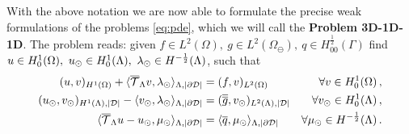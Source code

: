 \documentclass[r]{siamart171218}
\newcommand{\kentold}[1]{{\color{black}#1}}
\newcommand{\paoloold}[1]{{\color{black}#1}}
\begin{document}

\kentold{With the above notation we are now able to formulate the precise weak formulations of the problems \eqref{eq:pde}, which we will call the \textbf{Problem 3D-1D-1D}. The problem} reads:
\paoloold{given $f\in L^2(\Omega), \ g \in L^2(\Omega_{\ominus}), \ q \in H^\frac12_{00}(\Gamma)$}
find $u \in H^1_0(\Omega),\ u_{\odot} \in H^1_0(\Lambda), \ \lambda_{\odot} \in H^{-\frac 1 2}(\Lambda)$, such that
\begin{subequations}\label{eq:problem2}
\begin{align}
\label{eq:problem2a}
(u,v)_{H^1(\Omega)} 
+  \langle \mtrace v, \ld \rangle_{\Lambda, |\DD|} &= 
(f,v)_{L^2(\Omega)} &\forall v \in H^1_0(\Omega)\, ,
\\
\label{eq:problem2b}
(\ud,\vd)_{H^1(\Lambda),|\D|} - \langle  \vd, \ld \rangle_{\Lambda, |\DD|} 
&=  (\avrd{g},\vd)_{L^2(\Lambda),|\D|}
&\forall \vd \in H^1_0(\Lambda)\, ,
\\
\label{eq:problem2c}
\langle \mtrace u -   \ud, \md \rangle_{\Lambda,|\DD|} 
&= \paoloold{\langle \avrc{q},\md\rangle_{\Lambda,|\DD|}}
&\forall \md \in H^{-\frac 1 2}(\Lambda)\,.
\end{align}
\end{subequations}
\end{document}
